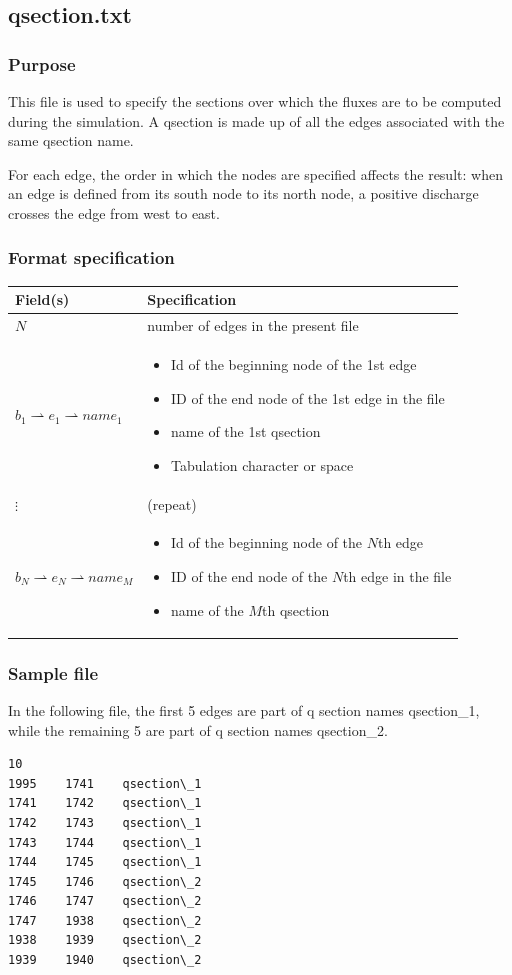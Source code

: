 \subsection{\label{sec:qsection}qsection.txt}
%
\subsubsection{Purpose}
This file is used to specify the sections over which the fluxes are to be computed during the simulation.
A qsection is made up of all the edges associated with the same qsection name.

For each edge, the order in which the nodes are specified affects the result: when an edge is defined from its south node to its north node, a positive discharge crosses the edge from west to east.

%
\subsubsection{Format specification}
\begin{footnotesize}
\begin{tabular}{p{4cm} | p{10cm} }
\hline
Field(s) & Specification \\
\hline
\hline
$N$ & number of edges in the present file \\
\hline
$b_1 \rightharpoonup e_1 \rightharpoonup name_1$ &
\begin{itemize}
\item [$b_1$] Id of the beginning node of the 1st edge
\item [$e_1$] ID of the end node of the 1st edge in the file
\item [$name_1$] name of the 1st qsection
\item [$\rightharpoonup$] Tabulation character or space
\end{itemize} \\
\hline
$\vdots$ & (repeat) \\
\hline
$b_N \rightharpoonup e_N \rightharpoonup name_M$ & 
\begin{itemize}
\item [$b_N$] Id of the beginning node of the $N$th edge
\item [$e_N$] ID of the end node of the $N$th edge in the file
\item [$name_M$] name of the $M$th qsection
\end{itemize} \\
\hline
\end{tabular}
\end{footnotesize}

%
\subsubsection{Sample file}
In the following file, the first 5 edges are part of q section names qsection\_1, while the remaining 5 are part of q section names qsection\_2. 
\begin{verbatim}
10
1995	1741	qsection\_1
1741	1742	qsection\_1
1742	1743	qsection\_1
1743	1744	qsection\_1
1744	1745	qsection\_1
1745	1746	qsection\_2
1746	1747	qsection\_2
1747	1938	qsection\_2
1938	1939	qsection\_2
1939	1940	qsection\_2
\end{verbatim}